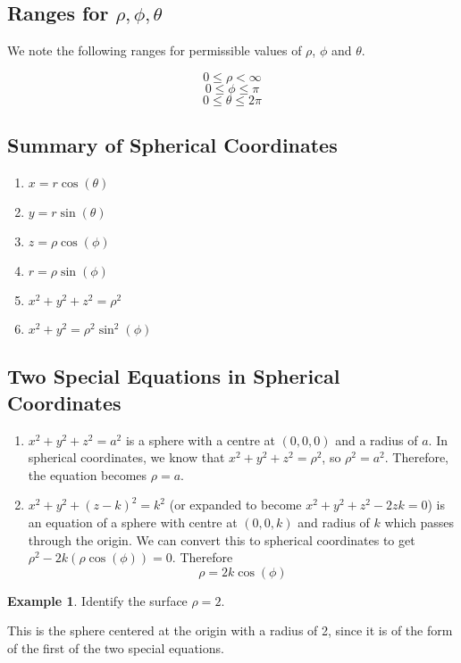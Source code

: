 \documentclass[11pt]{article}
\theoremstyle{plain} %
\theoremstyle{definition}
\theoremstyle{example}
\newtheorem*{example}{Example}
\theoremstyle{remark}
\begin{document}
\subsection{Ranges for $\rho, \phi, \theta$}

We note the following ranges for permissible values of $\rho$, $\phi$ and $\theta$. 

$$0 \leq \rho < \infty$$ $$0 \leq \phi \leq \pi$$ $$0 \leq \theta \leq 2\pi$$

\subsection{Summary of Spherical Coordinates}
\begin{enumerate}
	\item	$x = r \cos (\theta)$
	\item	$y = r \sin (\theta)$
	\item	$z = \rho \cos (\phi)$
	\item	$r = \rho \sin (\phi)$
	\item $x^2 + y^2 + z^2 = \rho^2$
	\item $x^2 + y^2 = \rho^2 \sin^2(\phi)$
\end{enumerate}

\subsection{Two Special Equations in Spherical Coordinates}

\begin{enumerate}
	\item $x^2 + y^2 + z^2 = a^2$ is a sphere with a centre at $(0,0,0)$ and a radius of $a$. In spherical coordinates, we know that $x^2+y^2+z^2 = \rho^2$, so $\rho^2 = a^2$. Therefore, the equation becomes $\rho = a$. 
	\item $x^2 + y^2 + (z-k)^2 = k^2$ (or expanded to become $x^2 + y^2 + z^2 -2zk=0$) is an equation of a sphere with centre at $(0,0,k)$ and radius of $k$ which passes through the origin. We can convert this to spherical coordinates to get $\rho^2 -2k(\rho \cos(\phi))=0$. Therefore $$\rho = 2k \cos(\phi)$$
\end{enumerate}

\begin{example}
Identify the surface $\rho =  2$. 
\end{example}

This is the sphere centered at the origin with a radius of 2, since it is of the form of the first of the two special equations. 
\end{document}
